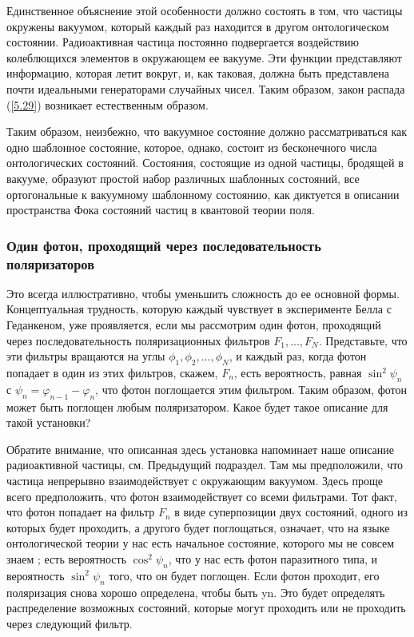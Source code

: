 \documentclass[main.tex]{subfiles}
\begin{document}
Единственное объяснение этой особенности должно состоять в том, что частицы окружены вакуумом, который каждый раз находится в другом онтологическом состоянии. Радиоактивная частица постоянно подвергается воздействию колеблющихся элементов в окружающем ее вакууме. Эти функции представляют информацию, которая летит вокруг, и, как таковая, должна быть представлена почти идеальными генераторами случайных чисел. Таким образом, закон распада (\ref{5.29}) возникает естественным образом.

Таким образом, неизбежно, что вакуумное состояние должно рассматриваться как одно шаблонное состояние, которое, однако, состоит из бесконечного числа онтологических состояний. Состояния, состоящие из одной частицы, бродящей в вакууме, образуют простой набор различных шаблонных состояний, все ортогональные к вакуумному шаблонному состоянию, как диктуется в описании пространства Фока состояний частиц в квантовой теории поля.


\subsubsection{Один фотон, проходящий через последовательность поляризаторов}\label{ch5.7.8}

Это всегда иллюстративно, чтобы уменьшить сложность до ее основной формы. Концептуальная трудность, которую каждый чувствует в эксперименте Белла с Геданкеном, уже проявляется, если мы рассмотрим один фотон, проходящий через последовательность поляризационных фильтров $F_1, ..., F_N$. Представьте, что эти фильтры вращаются на углы $\phi_1, \phi_2, ..., \phi_N$, и каждый раз, когда фотон попадает в один из этих фильтров, скажем, $F_n$, есть вероятность, равная $\sin^2 \psi_n$ с $\psi_n = \varphi_{n-1} - \varphi_n$, что фотон поглощается этим фильтром. Таким образом, фотон может быть поглощен любым поляризатором. Какое будет такое описание для такой установки?

Обратите внимание, что описанная здесь установка напоминает наше описание радиоактивной частицы, см. Предыдущий подраздел. Там мы предположили, что частица непрерывно взаимодействует с окружающим вакуумом. Здесь проще всего предположить, что
фотон взаимодействует со всеми фильтрами. Тот факт, что фотон попадает на фильтр $F_n$ в виде суперпозиции двух состояний, одного из которых будет проходить, а другого будет поглощаться, означает, что на языке онтологической теории у нас есть начальное состояние, которого мы не совсем знаем ; есть вероятность $\cos^2 \psi_n$, что у нас есть фотон паразитного типа, и вероятность $\sin^2 \psi_n$ того, что он будет поглощен. Если фотон проходит, его поляризация снова хорошо определена, чтобы быть yn. Это будет определять распределение возможных состояний, которые могут проходить или не проходить через следующий фильтр.
\end{document}
